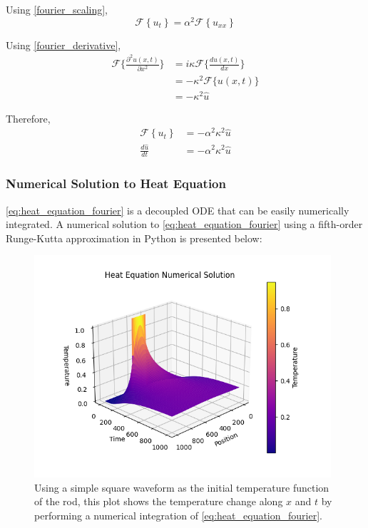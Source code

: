 Using \cref{fourier_scaling},
\begin{equation}
    \mathcal{F} \left\{ u_t \right\} = \alpha^2 \mathcal{F} \left\{ u_{xx} \right\}
\end{equation}

Using \cref{fourier_derivative},
    \begin{align}
        \mathcal{F}\{ \frac{\partial^2 u(x, t)}{\partial x^2} \} & = i \kappa \mathcal{F}\{ \frac{d u(x, t)}{dx} \} \\
        & = -\kappa^2 \mathcal{F}\{ u(x, t) \} \\
        & = -\kappa^2 \hat{u}
    \end{align}

Therefore,
\begin{align}
    \mathcal{F} \left\{ u_t \right\} &= -\alpha^2 \kappa^2 \hat{u} \\
    \frac{d \hat{u}}{dt} &= -\alpha^2 \kappa^2 \hat{u} \label{eq:heat_equation_fourier}
\end{align}

\subsubsection{Numerical Solution to Heat Equation} %
\cref{eq:heat_equation_fourier} is a decoupled ODE that can be easily numerically integrated. A numerical solution to \cref{eq:heat_equation_fourier} using a fifth-order Runge-Kutta approximation in Python is presented below:

\begin{figure}[H]
    \centering
    \includegraphics[width=110mm,height=\textheight,keepaspectratio]{images/heat_equation_numerical.png}
    \caption{Using a simple square waveform as the initial temperature function of the rod, this plot shows the temperature change along \(x\) and \(t\) by performing a numerical integration of \cref{eq:heat_equation_fourier}.}
    \label{fig:heat_equation_numerical}
\end{figure}

